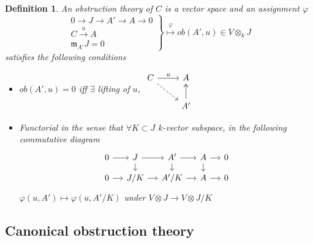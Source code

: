 \documentclass{ctexart}
\newtheorem{definition}{Definition}[section]
\begin{document}
\begin{definition}
    An obstruction theory of $C$ is a vector space and an assignment $\varphi$
    \begin{equation}
        \left.
            \begin{aligned}
                0 \rightarrow J \rightarrow A' \rightarrow A \rightarrow 0 \\
                C \overset{u}{\rightarrow}A \\
                \mathfrak{m}_{A'}J = 0
            \end{aligned}
        \right\}
        \overset{\varphi}{\longmapsto} ob(A', u)\in V \otimes_{k} J
    \end{equation}
    satisfies the following conditions
    \begin{itemize}
        \item $ob(A', u) = 0$ iff $\exists$ lifting of $u$,
        $
        \begin{tikzcd}
            C \arrow[r, "u"] \arrow[dr, dashrightarrow] &
            A \\
            & A' \arrow[u, twoheadrightarrow]
        \end{tikzcd}
        $
        \item Functorial in the sense that $\forall K \subset J$ $k$-vector subspace, in the following commutative diagram
        $$
        \begin{tikzcd}[sep = small]
            0 \arrow[r] &
            J \arrow[r] \arrow[d] &
            A' \arrow[r] \arrow[d] &
            A \arrow[r] \arrow[d] &
            0 \\
            0 \arrow[r] &
            J/K \arrow[r] &
            A'/K \arrow[r] &
            A \arrow[r] &
            0
        \end{tikzcd}
        $$
        $\varphi(u, A') \mapsto \varphi(u, A'/K)$ under $V \otimes J \rightarrow V \otimes J/K$
    \end{itemize}
\end{definition}

\subsection{Canonical obstruction theory}
\label{subsection:Obstruction_Theory_of_Moduli_Space_Canonical_obstruction_theory}
\end{document}
